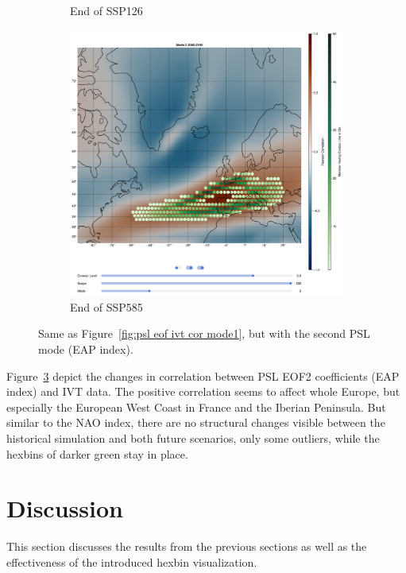 \begin{figure}[!htb]
\begin{subfigure}[b]{0.32\textwidth}
    \caption{End of SSP126} 
    \label{fig:psl eof ivt cor ssp126 mode2}
  \end{subfigure}
  \begin{subfigure}[b]{0.32\textwidth}
    \includegraphics[width=\textwidth]{figures/psl_ivt_cor_mode2_ssp585.png}
    \caption{End of SSP585}
    \label{fig:psl eof ivt cor ssp585 mode2}
  \end{subfigure}
  \caption{Same as Figure~\ref{fig:psl eof ivt cor mode1}, but with the second PSL mode (EAP index).}
  \label{fig:psl eof ivt cor mode2}
\end{figure}

Figure~\ref{fig:psl eof ivt cor mode2} depict the changes in correlation between PSL EOF2 coefficients (EAP index) and IVT data. 
The positive correlation seems to affect whole Europe, but especially the European West Coast in France and the Iberian Peninsula. 
But similar to the NAO index, there are no structural changes visible between the historical simulation and both future scenarios, only some outliers, while the hexbins of darker green stay in place.

\section{Discussion}
\label{sec:discussion}

This section discusses the results from the previous sections as well as the effectiveness of the introduced hexbin visualization. 

